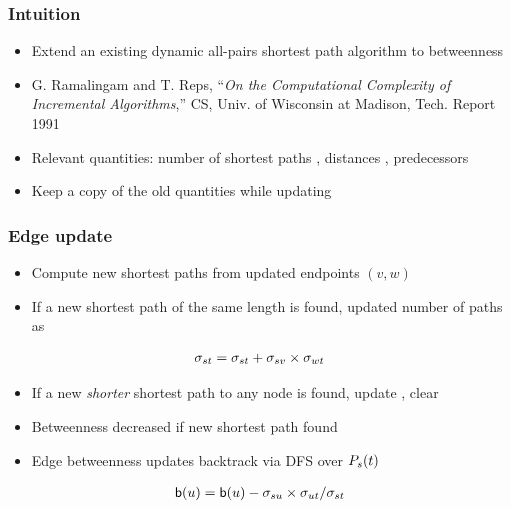 \begin{frame}
  \frametitle{Intuition}
  
  \begin{itemize}
    \item Extend an existing dynamic all-pairs shortest path algorithm to betweenness
    \item G. Ramalingam and T. Reps, ``\emph{On the Computational Complexity of Incremental Algorithms},'' CS, Univ. of Wisconsin at Madison, Tech. Report 1991
    \item Relevant quantities: number of shortest paths \paths, distances \dist, predecessors \pred
    \item Keep a copy of the old quantities while updating
  \end{itemize}
    
\end{frame}


\begin{frame}
  \frametitle{Edge update}
  
  \begin{itemize}
    \item Compute new shortest paths from updated endpoints $(v,w)$
    \item If a new shortest path of the same length is found, updated number of paths as
  \end{itemize}
  {\Large
  \begin{align*}
    \sigma_{st} = \sigma_{st} + \sigma_{sv} \times \sigma_{wt}
  \end{align*}
  }
    \begin{itemize}
    \item If a new \emph{shorter} shortest path to any node is found, update \dist, clear \paths
    \item Betweenness decreased if new shortest path found
    \item Edge betweenness updates backtrack via DFS over $P_s(t)$
  \end{itemize}
    {\Large
  \begin{align*}
    \mathsf{b}(u) = \mathsf{b}(u) - \sigma_{su} \times \sigma_{ut} / \sigma_{st}
  \end{align*}
  }
\end{frame}


